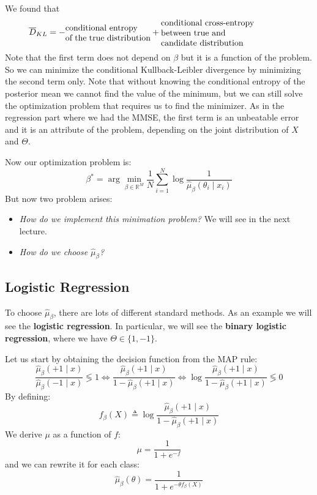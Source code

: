 We found that
\[
    \overline{D}_{KL} = - \parbox{10em}{conditional entropy \\of the true distribution} + \parbox{15em}{ conditional cross-entropy\\ between true and \\ candidate distribution}
\]
Note that the first term does not depend on $\beta$ but it is a function of the problem. So we can minimize the conditional Kullback-Leibler divergence by minimizing the second term only. Note that without knowing the conditional entropy of the posterior mean we cannot find the value of the minimum, but we can still solve the optimization problem that requires us to find the minimizer. As in the regression part where we had the MMSE, the first term is an unbeatable error and it is an attribute of the problem, depending on the joint distribution of $X$ and $\Theta$.

Now our optimization problem is:
\[
    \beta^\ast = \arg\min_{\beta \in \mathbb{R}^M} \frac{1}{N} \sum_{i=1}^{N} \log \frac{1}{\hat{\mu}_\beta(\theta_i \mid x_i)}
\]
But now two problem arises:
\begin{itemize}
    \item \textit{How do we implement this minimation problem?} We will see in the next lecture.
    \item \textit{How do we choose $\hat{\mu}_\beta$?}
\end{itemize}

\subsection*{Logistic Regression}
To choose $\hat{\mu}_\beta$, there are lots of different standard methods. As an example we will see the \textbf{logistic regression}. In particular, we will see the \textbf{binary logistic regression}, where we have $\Theta \in \{1,-1\}$.

Let us start by obtaining the decision function from the MAP rule:
\[
    \frac{\hat{\mu}_\beta(+1\mid x)}{\hat{\mu}_\beta(-1\mid x)} \lessgtr 1 \Leftrightarrow \frac{\hat{\mu}_\beta(+1\mid x)}{1 - \hat{\mu}_\beta(+1\mid x)} \Leftrightarrow \log \frac{\hat{\mu}_\beta(+1\mid x)}{1 - \hat{\mu}_\beta(+1\mid x)} \lessgtr 0
\]
By defining:
\[
    f_\beta(X) \triangleq \log \frac{\hat{\mu}_\beta(+1\mid x)}{1 - \hat{\mu}_\beta(+1\mid x)}
\]
We derive $\mu$ as a function of $f$:
\[
    \mu = \frac{1}{1 + e^{-f}}
\]
and we can rewrite it for each class:
\[
    \hat{\mu}_{\beta}(\theta) = \frac{1}{1 + e^{-\theta f_\beta(X)}}
\]

